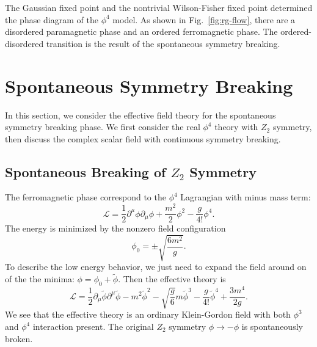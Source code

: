 \documentclass[aps,prb,superscriptaddress,nofootinbib]{revtex4}
\begin{document}
The Gaussian fixed point and the nontrivial Wilson-Fisher fixed point determined the phase diagram of the $\phi^4$ model.
As shown in Fig.~\ref{fig:rg-flow}, there are a disordered paramagnetic phase and an ordered ferromagnetic phase.
The ordered-disordered transition is the result of the spontaneous symmetry breaking.




\section{Spontaneous Symmetry Breaking}

In this section, we consider the effective field theory for the spontaneous symmetry breaking phase.
We first consider the real $\phi^4$ theory with $Z_2$ symmetry, then discuss the complex scalar field with continuous symmetry breaking.

\subsection{Spontaneous Breaking of $Z_2$ Symmetry}
The ferromagnetic phase correspond to the $\phi^4$ Lagrangian with minus mass term:
\begin{equation}
	\mathcal L =\frac{1}{2}\partial^\mu \phi \partial_\mu \phi +\frac{m^2}{2}\phi^2 - \frac{g}{4!}\phi^4.
\end{equation}
The energy is minimized by the nonzero field configuration
\begin{equation}
	\phi_0 = \pm \sqrt{\frac{6m^2}{g}}.
\end{equation}
To describe the low energy behavior, we just need to expand the field around on of the the minima: $\phi = \phi_0 +\tilde\phi$.
Then the effective theory is
\begin{equation}
	\mathcal{L}=\frac{1}{2} \partial_{\mu} \tilde{\phi}\partial^{\mu} \tilde{\phi} -m^{2} \tilde{\phi}^{2}-\sqrt{\frac{g}{6}} m \tilde{\phi}^{3}-\frac{g}{4 !} \tilde{\phi}^{4}+\frac{3 m^{4}}{2 g}.
\end{equation}
We see that the effective theory is an ordinary Klein-Gordon field with both $\phi^3$ and $\phi^4$ interaction present.
The original $Z_2$ symmetry $\phi \rightarrow -\phi$ is spontaneously broken. 
\end{document}
